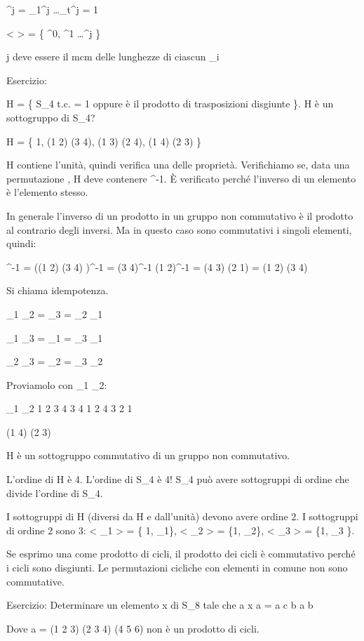 \sigma^j = \mu_1^j \dots \mu_t^j = 1

< \sigma > = \{ \sigma^0, \sigma^1 \dots \sigma^j \}

j deve essere il mcm delle lunghezze di ciascun \mu_i

Esercizio:

H = \{ \sigma \in S_4 t.c. \sigma = 1 oppure \sigma \`e il prodotto di trasposizioni disgiunte \}. H \`e un sottogruppo di S_4?

H = \{ 1, (1 2) (3 4), (1 3) (2 4), (1 4) (2 3) \}

H contiene l'unit\`a, quindi verifica una delle propriet\`a. Verifichiamo se, data una permutazione \sigma, H deve contenere \sigma^{-1}. \`E verificato perch\'e l'inverso di un elemento \`e l'elemento stesso.

In generale l'inverso di un prodotto in un gruppo non commutativo \`e il prodotto al contrario degli inversi. Ma in questo caso sono commutativi i singoli elementi, quindi:

\sigma^{-1} = ((1 2) (3 4) )^{-1} = (3 4)^{-1} (1 2)^{-1} = (4 3) (2 1) = (1 2) (3 4)

Si chiama idempotenza.

\sigma_1 \sigma_2 = \sigma_3 = \sigma_2 \sigma_1

\sigma_1 \sigma_3 = \sigma_1 = \sigma_3 \sigma_1

\sigma_2 \sigma_3 = \sigma_2 = \sigma_3 \sigma_2

Proviamolo con \sigma_1 \sigma_2:

\sigma_1 \sigma_2
1 2 3 4
3 4 1 2
4 3 2 1

(1 4) (2 3)

H \`e un sottogruppo commutativo di un gruppo non commutativo.

L'ordine di H \`e 4. L'ordine di S_4 \`e 4! S_4 pu\`o avere sottogruppi di ordine che divide l'ordine di S_4.

I sottogruppi di H (diversi da H e dall'unit\`a) devono avere ordine 2. I sottogruppi di ordine 2 sono 3: < \sigma_1 > = \{ 1, \sigma_1\}, < \sigma_2 > = \{1, \sigma_2\}, < \sigma_3 > = \{1, \sigma_3 \}.

Se esprimo una \sigma come prodotto di cicli, il prodotto dei cicli \`e commutativo perch\'e i cicli sono disgiunti. Le permutazioni cicliche con elementi in comune non sono commutative.

Esercizio:
Determinare un elemento x di S_8 tale che a x a = a c b a b

Dove a = (1 2 3) (2 3 4) (4 5 6)
non \`e un prodotto di cicli.

